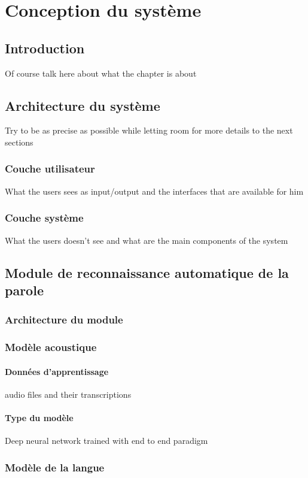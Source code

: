 \chapter{Conception du système}

\section{Introduction}
Of course talk here about what the chapter is about

\section{Architecture du système}
Try to be as precise as possible while letting room for more details to the next sections
	\subsection{Couche utilisateur}
	What the users sees as input/output and the interfaces that are available for him
	\subsection{Couche système }
	What the users doesn't see and what are the main components of the system

\section{Module de reconnaissance automatique de la parole}
	\subsection{Architecture du module}
	\subsection{Modèle acoustique}
		\subsubsection*{Données d'apprentissage}
		audio files and their transcriptions
		\subsubsection*{Type du modèle}
		Deep neural network trained with end to end paradigm
	
	\subsection{Modèle de la langue}
